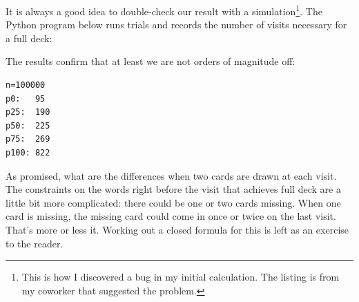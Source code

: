 \newpage

It is always a good idea to double-check our result with a simulation\footnote{This is how I discovered a bug in my initial calculation. The listing is from my coworker that suggested the problem.}. The Python program below runs trials and records the number of visits necessary for a full deck:



The results confirm that at least we are not orders of magnitude off: 
\begin{lstlisting}
n=100000
p0:   95
p25:  190
p50:  225
p75:  269
p100: 822
\end{lstlisting}

As promised, what are the differences when two cards are drawn at each visit. The constraints on the words right before the visit that achieves full deck are a little bit more complicated: there could be one or two cards missing. When one card is missing, the missing card could come in once or twice on the last visit. That's more or less it. Working out a closed formula for this is left as an exercise to the reader.

